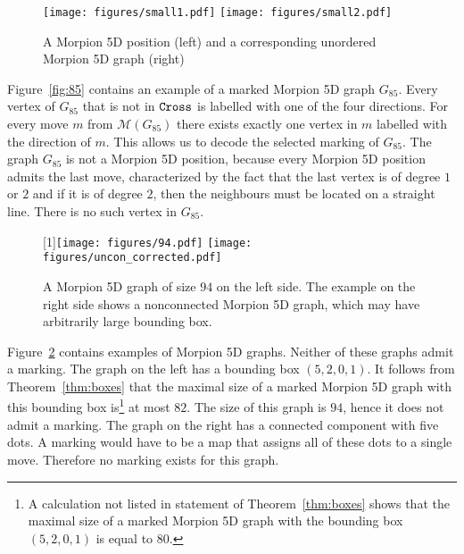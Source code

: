 \begin{figure}
    \texttt{[image: figures/small1.pdf]}
    \texttt{[image: figures/small2.pdf]}
    \caption{\label{fig:small}
      A Morpion 5D position (left) and a corresponding unordered Morpion 5D graph (right)
    }
\end{figure}
 
\begin{example}
Figure~\ref{fig:85} contains an example of a marked Morpion 5D graph $G_{85}$. 
Every vertex of $G_{85}$ that is not in $\texttt{Cross}$ is labelled with one of the four directions. 
For every move $m$ from $\mathcal{M}(G_{85})$ there exists exactly one vertex in $m$ 
  labelled with the direction of $m$.
This allows us to decode the selected marking of $G_{85}$.
The graph $G_{85}$ is not a Morpion 5D position,  because every Morpion 5D position admits the last move, characterized by the fact that the last vertex is of degree $1$ or $2$ and if it is
of degree $2$, then the neighbours must be located on a straight line. 
There is no such vertex in $G_{85}$.
\end{example}

\begin{figure}
  \centering
    \scalebox{-1}[1]{\texttt{[image: figures/94.pdf]}}
    \texttt{[image: figures/uncon\_corrected.pdf]}
  \caption{
    A Morpion 5D graph of size $94$ on the left side. 
    The example on the right side shows a nonconnected Morpion 5D graph,
      which may have arbitrarily large bounding box.
  }
  \label{fig:uncon}
\end{figure}

\begin{example}
Figure~\ref{fig:uncon} contains examples of Morpion 5D graphs.
Neither of these graphs admit a marking.
The graph on the left has a bounding box $(5,2,0,1)$.
It follows from Theorem~\ref{thm:boxes} that the maximal size of a marked Morpion 5D graph with this 
  bounding box is\footnote{A calculation not listed in statement of Theorem~\ref{thm:boxes} shows that the maximal size of a marked Morpion 5D graph
with the bounding box $(5,2,0,1)$ is equal to $80$.} at most $82$.
The size of this graph is $94$, hence it does not admit a marking.
The graph on the right has a connected component with five dots.
A marking would have to be a map that assigns all of these dots to a single move.
Therefore no marking exists for this graph.
\end{example}

